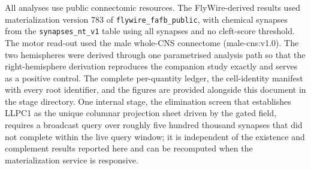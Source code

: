 \documentclass[11pt]{article}
\begin{document}
All analyses use public connectomic resources. The FlyWire-derived results used materialization
version 783 of \texttt{flywire\_fafb\_public}, with chemical synapses from the
\texttt{synapses\_nt\_v1} table using all synapses and no cleft-score threshold. The motor
read-out used the male whole-CNS connectome (male-cns:v1.0). The two hemispheres were derived
through one parametrised analysis path so that the right-hemisphere derivation reproduces the
companion study exactly and serves as a positive control. The complete per-quantity ledger, the
cell-identity manifest with every root identifier, and the figures are provided alongside this
document in the stage directory. One internal stage, the elimination screen that establishes
LLPC1 as the unique columnar projection sheet driven by the gated field, requires a broadcast
query over roughly five hundred thousand synapses that did not complete within the live query
window; it is independent of the existence and complement results reported here and can be
recomputed when the materialization service is responsive.
\end{document}
